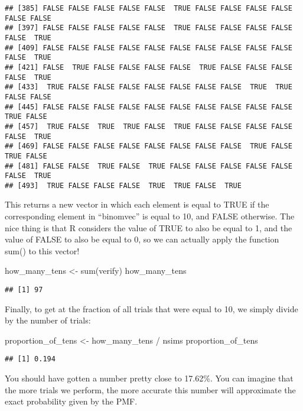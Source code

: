 \documentclass[
]{book}
\newenvironment{Shaded}{\begin{snugshade}}{\end{snugshade}}
\newcommand{\FunctionTok}[1]{\textcolor[rgb]{0.00,0.00,0.00}{#1}}
\newcommand{\NormalTok}[1]{#1}
\newcommand{\OtherTok}[1]{\textcolor[rgb]{0.56,0.35,0.01}{#1}}
\newcommand{\SpecialCharTok}[1]{\textcolor[rgb]{0.00,0.00,0.00}{#1}}
\begin{document}
\begin{verbatim}
## [385] FALSE FALSE FALSE FALSE FALSE  TRUE FALSE FALSE FALSE FALSE FALSE FALSE
## [397] FALSE FALSE FALSE FALSE FALSE  TRUE FALSE FALSE FALSE FALSE FALSE  TRUE
## [409] FALSE FALSE FALSE FALSE FALSE FALSE FALSE FALSE FALSE FALSE FALSE  TRUE
## [421] FALSE  TRUE FALSE FALSE FALSE FALSE  TRUE FALSE FALSE FALSE FALSE  TRUE
## [433]  TRUE FALSE FALSE FALSE FALSE FALSE FALSE FALSE  TRUE  TRUE FALSE FALSE
## [445] FALSE FALSE FALSE FALSE FALSE FALSE FALSE FALSE FALSE FALSE  TRUE FALSE
## [457]  TRUE FALSE  TRUE  TRUE FALSE  TRUE FALSE FALSE FALSE FALSE FALSE  TRUE
## [469] FALSE FALSE FALSE FALSE FALSE FALSE FALSE FALSE  TRUE FALSE  TRUE FALSE
## [481] FALSE FALSE  TRUE FALSE  TRUE FALSE FALSE FALSE FALSE FALSE FALSE  TRUE
## [493]  TRUE FALSE FALSE FALSE  TRUE  TRUE FALSE  TRUE
\end{verbatim}

This returns a new vector in which each element is equal to TRUE if the corresponding element in ``binomvec'' is equal to 10, and FALSE otherwise. The nice thing is that R considers the value of TRUE to also be equal to 1, and the value of FALSE to also be equal to 0, so we can actually apply the function sum() to this vector!

\begin{Shaded}
\begin{Highlighting}[]
\NormalTok{how\_many\_tens }\OtherTok{\textless{}{-}} \FunctionTok{sum}\NormalTok{(verify)}
\NormalTok{how\_many\_tens}
\end{Highlighting}
\end{Shaded}

\begin{verbatim}
## [1] 97
\end{verbatim}

Finally, to get at the fraction of all trials that were equal to 10, we simply divide by the number of trials:

\begin{Shaded}
\begin{Highlighting}[]
\NormalTok{proportion\_of\_tens }\OtherTok{\textless{}{-}}\NormalTok{ how\_many\_tens }\SpecialCharTok{/}\NormalTok{ nsims}
\NormalTok{proportion\_of\_tens}
\end{Highlighting}
\end{Shaded}

\begin{verbatim}
## [1] 0.194
\end{verbatim}

You should have gotten a number pretty close to 17.62\%. You can imagine that the more trials we perform, the more accurate this number will approximate the exact probability given by the PMF.
\end{document}
